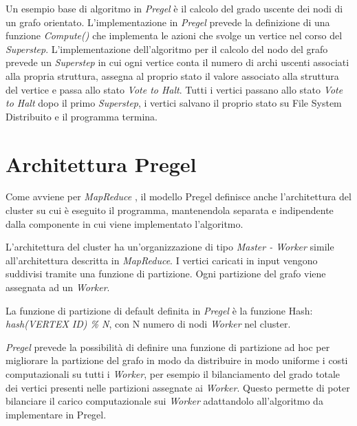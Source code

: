 \documentclass[LaM,binding=0.6cm]{sapthesis}
\begin{document}
Un esempio base di algoritmo in \textit{Pregel }\cite{Malewicz:2010:PSL:1807167.1807184} è il calcolo del grado uscente dei nodi di un grafo orientato. 
L'implementazione in \textit{Pregel} prevede la definizione di una funzione \textit{Compute()} che implementa le azioni che svolge un vertice nel corso del \textit{Superstep}. L'implementazione dell'algoritmo per il calcolo del nodo del grafo prevede un \textit{Superstep} in cui ogni vertice conta il numero di archi uscenti associati alla propria struttura, assegna al proprio stato il valore associato alla struttura del vertice e passa allo stato \textit{Vote to Halt}.
Tutti i vertici passano allo stato \textit{Vote to Halt} dopo il primo \textit{Superstep}, i vertici salvano il proprio stato su File System Distribuito e il programma termina.

\begin{minipage}{\linewidth}

\end{minipage}


\section{Architettura Pregel}

Come avviene per \textit{MapReduce} \cite{Dean:2008:MSD:1327452.1327492}, il modello Pregel definisce anche l'architettura del cluster su cui è eseguito il programma, mantenendola separata e indipendente dalla componente in cui viene implementato l'algoritmo.

L’architettura del cluster ha un'organizzazione di tipo \textit{Master - Worker} simile all'architettura descritta in \textit{MapReduce}.
I vertici caricati in input vengono suddivisi tramite una funzione di partizione. Ogni partizione del grafo viene assegnata ad un \textit{Worker}. 

La funzione di partizione di default definita in \textit{Pregel} è la funzione Hash:
\textit{hash(VERTEX ID) \% N}, con N numero di nodi \textit{Worker} nel cluster.

\textit{Pregel} prevede la possibilità di definire una funzione di partizione ad hoc per migliorare la partizione del grafo in modo da distribuire in modo uniforme i costi computazionali su tutti i \textit{Worker}, per esempio il bilanciamento del grado totale dei vertici presenti nelle partizioni assegnate ai \textit{Worker}. Questo permette di poter bilanciare il carico computazionale sui \textit{Worker} adattandolo all'algoritmo da implementare in Pregel.
\end{document}
